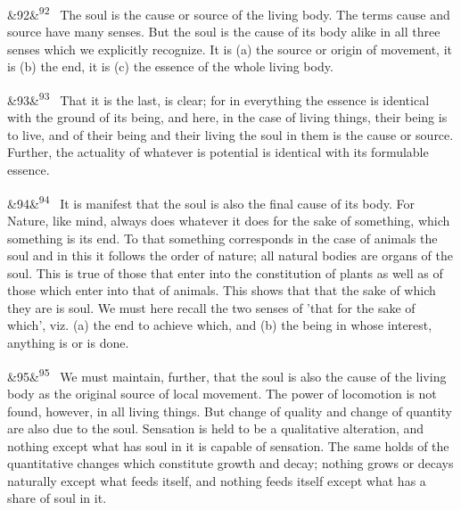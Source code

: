 \documentclass[12pt]{article}
\newcommand{\para}[1][]{\par\noindent\ifx&#1&\else\textsuperscript{\footnotesize #1}~\fi}
\begin{document}
\para[92] The soul is the cause or source of the living body. The terms cause and source have many senses. But the soul is the cause of its body alike in all three senses which we explicitly recognize. It is (a) the source or origin of movement, it is (b) the end, it is (c) the essence of the whole living body.

\para[93] That it is the last, is clear; for in everything the essence is identical with the ground of its being, and here, in the case of living things, their being is to live, and of their being and their living the soul in them is the cause or source. Further, the actuality of whatever is potential is identical with its formulable essence.

\para[94] It is manifest that the soul is also the final cause of its body. For Nature, like mind, always does whatever it does for the sake of something, which something is its end. To that something corresponds in the case of animals the soul and in this it follows the order of nature; all natural bodies are organs of the soul. This is true of those that enter into the constitution of plants as well as of those which enter into that of animals. This shows that that the sake of which they are is soul. We must here recall the two senses of 'that for the sake of which', viz. (a) the end to achieve which, and (b) the being in whose interest, anything is or is done.

\para[95] We must maintain, further, that the soul is also the cause of the living body as the original source of local movement. The power of locomotion is not found, however, in all living things. But change of quality and change of quantity are also due to the soul. Sensation is held to be a qualitative alteration, and nothing except what has soul in it is capable of sensation. The same holds of the quantitative changes which constitute growth and decay; nothing grows or decays naturally except what feeds itself, and nothing feeds itself except what has a share of soul in it.
\end{document}
